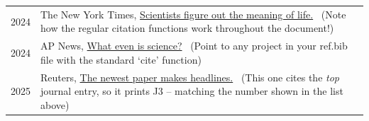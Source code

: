% 
\begin{longtable}[l]{@{}p{} p{}@{}}

    2024 & The New York Times, \href{https://nyt.com}{Scientists figure out the meaning of life.}~\cite{art1} (Note how the regular citation functions work throughout the document!) \\
    
    2024 & AP News, \href{https://apnews.com/}{What even is science?}~\cite{art2} (Point to any project in your ref.bib file with the standard `cite' function) \\

    2025 & Reuters, \href{https://reuters.com}{The newest paper makes headlines.}~\cite{art3} (This one cites the \emph{top} journal entry, so it prints J3 -- matching the number shown in the list above) \\

    
\end{longtable}

